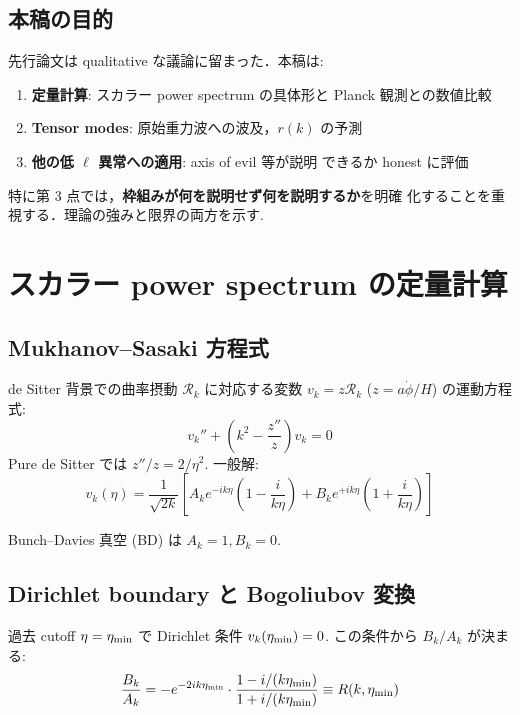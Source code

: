 \documentclass[11pt,a4paper]{article}
\begin{document}
\subsection{本稿の目的}

先行論文は qualitative な議論に留まった．本稿は:
\begin{enumerate}
\item \textbf{定量計算}: スカラー power spectrum の具体形と Planck
観測との数値比較
\item \textbf{Tensor modes}: 原始重力波への波及，$r(k)$ の予測
\item \textbf{他の低 $\ell$ 異常への適用}: axis of evil 等が説明
できるか honest に評価
\end{enumerate}

特に第 3 点では，\textbf{枠組みが何を説明せず何を説明するか}を明確
化することを重視する．理論の強みと限界の両方を示す.

\section{スカラー power spectrum の定量計算}

\subsection{Mukhanov--Sasaki 方程式}

de Sitter 背景での曲率摂動 $\mathcal{R}_k$ に対応する変数
$v_k = z\mathcal{R}_k$ ($z = a\dot\phi/H$) の運動方程式:
\begin{equation}
v_k'' + \left(k^2 - \frac{z''}{z}\right) v_k = 0
\end{equation}
Pure de Sitter では $z''/z = 2/\eta^2$. 一般解:
\begin{equation}
v_k(\eta) = \frac{1}{\sqrt{2k}}\left[A_k e^{-ik\eta}\left(1 - \frac{i}{k\eta}\right)
+ B_k e^{+ik\eta}\left(1 + \frac{i}{k\eta}\right)\right]
\end{equation}

Bunch--Davies 真空 (BD) は $A_k = 1, B_k = 0$.

\subsection{Dirichlet boundary と Bogoliubov 変換}

過去 cutoff $\eta = \eta_{\rm min}$ で Dirichlet 条件 $v_k(\eta_{\rm min}) = 0$.
この条件から $B_k/A_k$ が決まる:
\begin{equation}\label{eq:R-def}
\frac{B_k}{A_k} = -e^{-2ik\eta_{\rm min}}\cdot
\frac{1 - i/(k\eta_{\rm min})}{1 + i/(k\eta_{\rm min})}
\equiv R(k, \eta_{\rm min})
\end{equation}
\end{document}

